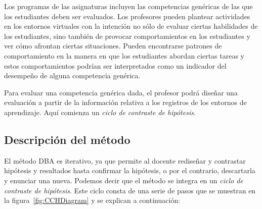 Los programas de las asignaturas incluyen las competencias genéricas de las que los estudiantes deben ser evaluados. Los profesores pueden plantear actividades en los entornos virtuales con la intención no sólo de evaluar ciertas habilidades de los estudiantes, sino también de provocar comportamientos en los estudiantes y ver cómo afrontan ciertas situaciones. Pueden encontrarse patrones de comportamiento en la manera en que los estudiantes abordan ciertas tareas y estos comportamientos podrían ser interpretados como un indicador del desempeño de alguna competencia genérica.

Para evaluar una competencia genérica dada, el profesor podrá diseñar una evaluación a partir de la información relativa a los registros de los entornos de aprendizaje. Aquí comienza un \emph{ciclo de contraste de hipótesis}. 





\subsection{Descripción del método}

El método DBA es iterativo, ya que permite al docente rediseñar y contrastar hipótesis y resultados hasta confirmar la hipótesis, o por el contrario, descartarla y enunciar una nueva. Podemos decir que el método se integra en un \emph{ciclo de contraste de hipótesis}. Este ciclo consta de una serie de pasos que se muestran en la figura~\ref{fig:CCHDiagram} y se explican a continuación:

